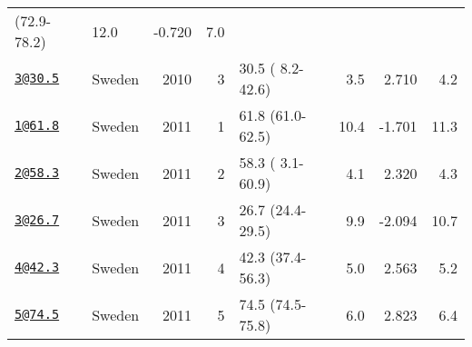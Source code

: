 \documentclass[]{article}
\begin{document}
\begin{longtable}[]{@{}llrrlrrr@{}}
(72.9-78.2) & 12.0 & -0.720 & 7.0\tabularnewline
\href{mailto:3@30.5}{\nolinkurl{3@30.5}} & Sweden & 2010 & 3 & 30.5 (
8.2-42.6) & 3.5 & 2.710 & 4.2\tabularnewline
\href{mailto:1@61.8}{\nolinkurl{1@61.8}} & Sweden & 2011 & 1 & 61.8
(61.0-62.5) & 10.4 & -1.701 & 11.3\tabularnewline
\href{mailto:2@58.3}{\nolinkurl{2@58.3}} & Sweden & 2011 & 2 & 58.3 (
3.1-60.9) & 4.1 & 2.320 & 4.3\tabularnewline
\href{mailto:3@26.7}{\nolinkurl{3@26.7}} & Sweden & 2011 & 3 & 26.7
(24.4-29.5) & 9.9 & -2.094 & 10.7\tabularnewline
\href{mailto:4@42.3}{\nolinkurl{4@42.3}} & Sweden & 2011 & 4 & 42.3
(37.4-56.3) & 5.0 & 2.563 & 5.2\tabularnewline
\href{mailto:5@74.5}{\nolinkurl{5@74.5}} & Sweden & 2011 & 5 & 74.5
(74.5-75.8) & 6.0 & 2.823 & 6.4\tabularnewline
\bottomrule
\end{longtable}

\newpage
\end{document}
